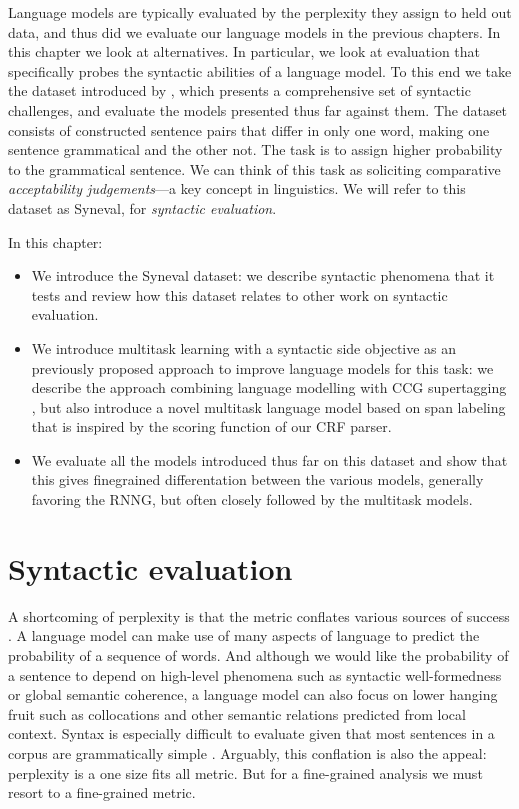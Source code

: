 Language models are typically evaluated by the perplexity they assign to held out data, and thus did we evaluate our language models in the previous chapters. In this chapter we look at alternatives. In particular, we look at evaluation that specifically probes the syntactic abilities of a language model. To this end we take the dataset introduced by \citet{linzen2018targeted}, which presents a comprehensive set of syntactic challenges, and evaluate the models presented thus far against them. The dataset consists of constructed sentence pairs that differ in only one word, making one sentence grammatical and the other not. The task is to assign higher probability to the grammatical sentence. We can think of this task as soliciting comparative \textit{acceptability judgements}---a key concept in linguistics. We will refer to this dataset as Syneval, for \textit{syntactic evaluation}.

In this chapter:
\begin{itemize}
  \item We introduce the Syneval dataset: we describe syntactic phenomena that it tests and review how this dataset relates to other work on syntactic evaluation.
  \item We introduce multitask learning with a syntactic side objective as an previously proposed approach to improve language models for this task: we describe the approach combining language modelling with CCG supertagging \citep{enguehard2017multitask}, but also introduce a novel multitask language model based on span labeling that is inspired by the scoring function of our CRF parser.
  \item We evaluate all the models introduced thus far on this dataset and show that this gives finegrained differentation between the various models, generally favoring the RNNG, but often closely followed by the multitask models.
\end{itemize}

\section{Syntactic evaluation}
A shortcoming of perplexity is that the metric conflates various sources of success \citep{linzen2018targeted}. A language model can make use of many aspects of language to predict the probability of a sequence of words. And although we would like the probability of a sentence to depend on high-level phenomena such as syntactic well-formedness or global semantic coherence, a language model can also focus on lower hanging fruit such as collocations and other semantic relations predicted from local context. Syntax is especially difficult to evaluate given that most sentences in a corpus are grammatically simple \citep{linzen2018targeted}. Arguably, this conflation is also the appeal: perplexity is a one size fits all metric. But for a fine-grained analysis we must resort to a fine-grained metric.

